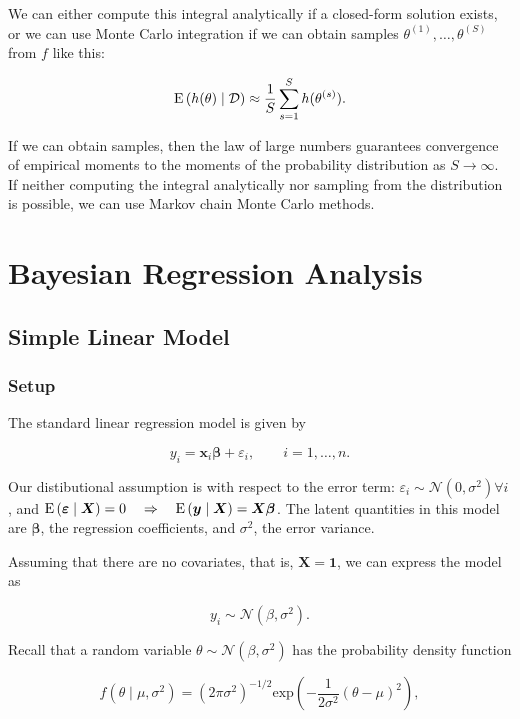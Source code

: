 We can either compute this integral analytically if a closed-form solution exists, or we can use Monte Carlo integration if we can obtain samples $\theta^{(1)},\dots,\theta^{(S)}$ from $f$ like this:

\[
	\mathrm{E}\left({h(\theta)\mid\mathcal{D}}\right) \approx \frac{1}{S}\sum^S_{s=1}h(\theta^{(s)}).
\]

If we can obtain samples, then the law of large numbers guarantees convergence of empirical moments to the moments of the probability distribution as $S\rightarrow \infty$.  If neither computing the integral analytically nor sampling from the distribution is possible, we can use Markov chain Monte Carlo methods.


\section{Bayesian Regression Analysis}

\subsection{Simple Linear Model}

\subsubsection{Setup}

The standard linear regression model is given by

\begin{equation}
	y_i = \bm{x}_i\bm{\beta} + \varepsilon_i, \qquad i = 1,\dots, n.
\end{equation}

Our distibutional assumption is with respect to the error term: $\varepsilon_i \sim \mathcal{N}(0,\sigma^2)\forall i$, and $\mathrm{E}\left({\bm{\varepsilon}\mid\bm{X}}\right) = 0 \quad \Rightarrow \quad \mathrm{E}\left({\bm{y}\mid\bm{X}}\right) = \bm{X\beta}$. The latent quantities in this model are $\bm{\beta}$, the regression coefficients, and $\sigma^2$, the error variance.

Assuming that there are no covariates, that is, $\bm{X} = \bm{1}$, we can express the model as 

\[
	y_i \sim \mathcal{N}(\beta,\sigma^2).
\]

Recall that a random variable $\theta \sim \mathcal{N}(\beta,\sigma^2)$ has the probability density function

\begin{equation}
	f(\theta\mid\mu,\sigma^2) = (2\pi\sigma^2)^{-1/2}\mathrm{exp}\left(-\frac{1}{2\sigma^2}(\theta-\mu)^2\right),
\end{equation}

